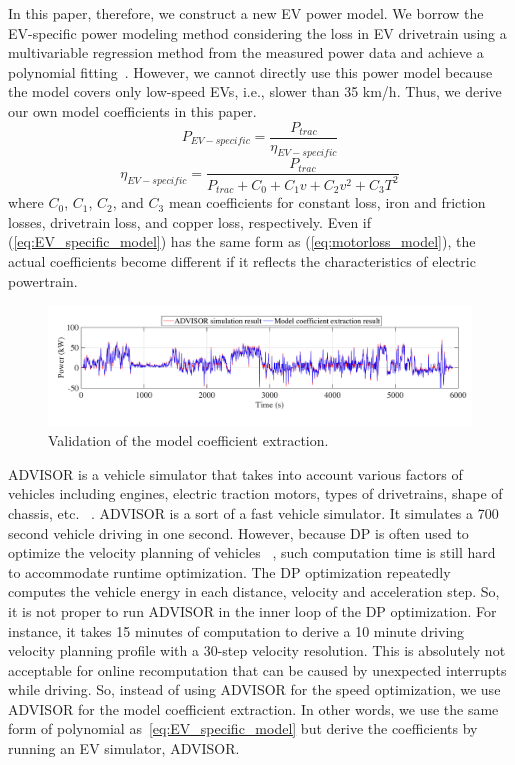 \documentclass{IEEEtran}
\begin{document}
In this paper, therefore, we construct a new EV power model. We borrow the  EV-specific power modeling method considering the loss in EV drivetrain using a multivariable regression method from the measured power data and achieve a polynomial fitting~\cite{Hong:ASPDAC16}. However, we cannot directly use this power model because the model covers only low-speed EVs, i.e., slower than 35 km/h. Thus, we derive our own model coefficients in this paper.
%
\begin{equation} \label{eq:EV_specific_model} %
P_{EV-specific} = \frac{P_{trac}}{\eta_{EV-specific}}
\end{equation} 
\begin{equation}
\eta_{EV-specific} = \frac{P_{trac}}{{P_{trac} + C_0 + C_1 v + C_2 v^2 + C_3 T^2}}\nonumber
\end{equation}	
where $C_0$, $C_1$, $C_2$, and $C_3$ mean coefficients for constant loss, iron and friction losses, drivetrain loss, and copper loss, respectively. Even if (\ref{eq:EV_specific_model}) has the same form as (\ref{eq:motorloss_model}), the actual coefficients become different if it reflects the characteristics of electric powertrain. 

\begin{figure}	%
\includegraphics[width=1.0\hsize]{Figures/ADVISOR_model_validation_result.pdf}
\caption{Validation of the model coefficient extraction.}
\label{fig:ADVISOR_model_validation}
\end{figure} 

ADVISOR is a vehicle simulator that takes into account various factors of vehicles including engines, electric traction motors, types of drivetrains, shape of chassis, etc. ~\cite{Markel:JPS02}. ADVISOR is a sort of a fast vehicle simulator. It simulates a 700 second vehicle driving in one second. However, because DP is often used to optimize the velocity planning of vehicles ~\cite{Lin:ICCA14,Dib:IVPPC11,Hellstrom:CEP09}, such computation time is still hard to accommodate runtime optimization.
The DP optimization repeatedly computes the vehicle energy in each distance, velocity and acceleration step. So, it is not proper to run ADVISOR in the inner loop of the DP optimization. For instance, it takes 15 minutes of computation to derive a 10 minute driving velocity planning profile with a 30-step velocity resolution. This is absolutely not acceptable for online recomputation that can be caused by unexpected interrupts while driving. So, instead of using ADVISOR for the speed optimization, we use ADVISOR for the model coefficient extraction. In other words, we use the same form of polynomial as~\eqref{eq:EV_specific_model} but derive the coefficients by running an EV simulator, ADVISOR.
\end{document}

